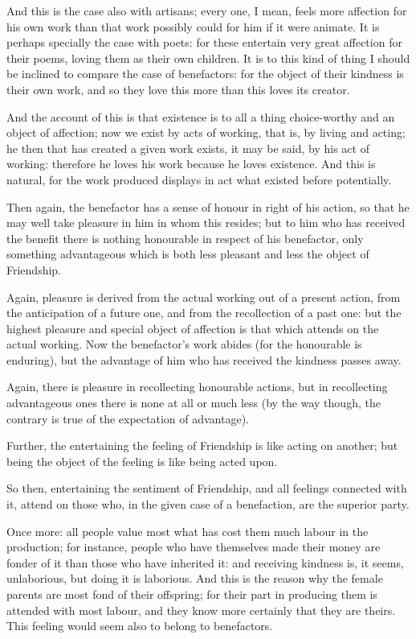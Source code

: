 And this is the case also with artisans; every one, I mean, feels more
affection for his own work than that work possibly could for him if it were
animate. It is perhaps specially the case with poets: for these entertain very
great affection for their poems, loving them as their own children. It is to
this kind of thing I should be inclined to compare the case of benefactors: for
the object of their kindness is their own work, and so they love this more than
this loves its creator.

And the account of this is that existence is to all a thing choice-worthy and
an object of affection; now we exist by acts of working, that is, by living and
acting; he then that has created a given work exists, it may be said, by his
act of working: therefore he loves his work because he loves existence. And
this is natural, for the work produced displays in act what existed before
potentially.

Then again, the benefactor has a sense of honour in right of his action, so
that he may well take pleasure in him in whom this resides; but to him who has
received the benefit there is nothing honourable in respect of his benefactor,
only something advantageous which is both less pleasant and less the object of
Friendship.

Again, pleasure is derived from the actual working out of a present action,
from the anticipation of a future one, and from the recollection of a past one:
but the highest pleasure and special object of affection is that which attends
on the actual working. Now the benefactor’s work abides (for the
honourable is enduring), but the advantage of him who has received the kindness
passes away.

Again, there is pleasure in recollecting honourable actions, but in
recollecting advantageous ones there is none at all or much less (by the way
though, the contrary is true of the expectation of advantage).

Further, the entertaining the feeling of Friendship is like acting on another;
but being the object of the feeling is like being acted upon.

So then, entertaining the sentiment of Friendship, and all feelings connected
with it, attend on those who, in the given case of a benefaction, are the
superior party.

Once more: all people value most what has cost them much labour in the
production; for instance, people who have themselves made their money are
fonder of it than those who have inherited it: and receiving kindness is, it
seems, unlaborious, but doing it is laborious. And this is the reason why the
female parents are most fond of their offspring; for their part in producing
them is attended with most labour, and they know more certainly that they are
theirs. This feeling would seem also to belong to benefactors.

